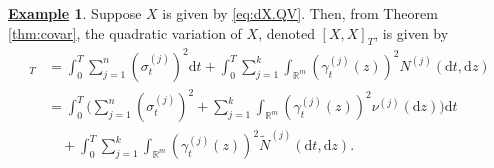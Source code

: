 \documentclass[12pt]{book}
\numberwithin{equation}{chapter}
\theoremstyle{plain}
\numberwithin{theorem}{section}
\theoremstyle{definition}
\newtheorem{example}[theorem]{\underline{Example}}
\numberwithin{exercise}{chapter}
\newcommand{\<}{\langle}
\renewcommand{\>}{\rangle}
\renewcommand{\(}{\left(}
\renewcommand{\)}{\right)}
\renewcommand{\[}{\left[}
\renewcommand{\]}{\right]}
\newcommand\Rb{\mathds{R}}
\newcommand\sig{\sigma}
\newcommand\gam{\gamma}
\newcommand\del{\delta}
\newcommand\Nt{\widetilde{N}}
\newcommand\dd{\mathrm{d}}
\begin{document}

\begin{example}
Suppose $X$ is given by \eqref{eq:dX.QV}.  Then, from Theorem \ref{thm:covar}, the quadratic variation of $X$, denoted $[X,X]_T$, is given by
\begin{align}
[X,X]_T
	&=	\int_0^T \sum_{j=1}^n (\sig_t^{(j)} )^2 \dd t + \int_0^T \sum_{j=1}^k \int_{\Rb^m} (\gam_t^{(j)}(z) )^2 N^{(j)}(\dd t, \dd z) \\
	&=	\int_0^T \Big( \sum_{j=1}^n (\sig_t^{(j)} )^2 + \sum_{j=1}^k \int_{\Rb^m} (\gam_t^{(j)}(z) )^2 \nu^{(j)}(\dd z) \Big) \dd t \\ &\quad
			+ \int_0^T \sum_{j=1}^k \int_{\Rb^m} (\gam_t^{(j)}(z) )^2 \Nt^{(j)}(\dd t, \dd z) .
\end{align}
\end{example}
\end{document}
